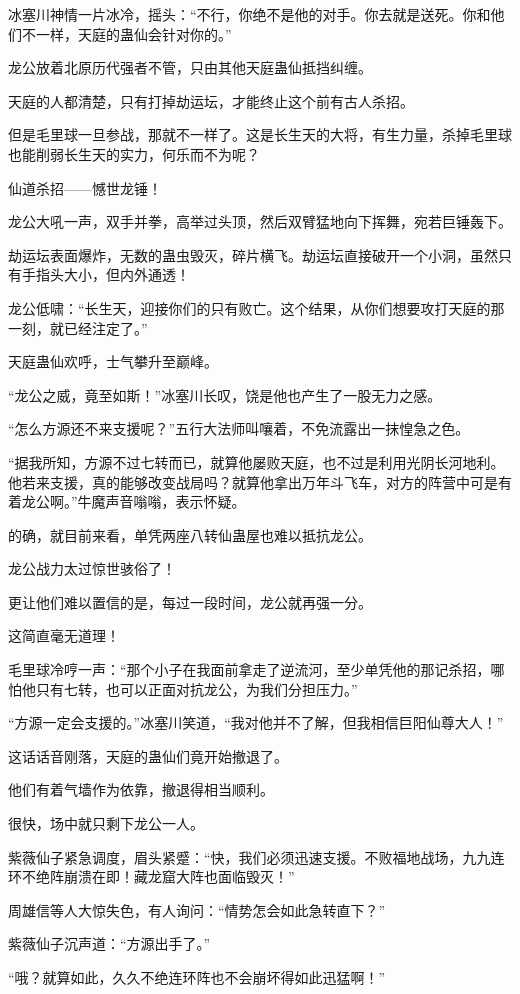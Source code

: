 \begin{this_body}
冰塞川神情一片冰冷，摇头：“不行，你绝不是他的对手。你去就是送死。你和他们不一样，天庭的蛊仙会针对你的。”

龙公放着北原历代强者不管，只由其他天庭蛊仙抵挡纠缠。

天庭的人都清楚，只有打掉劫运坛，才能终止这个前有古人杀招。

但是毛里球一旦参战，那就不一样了。这是长生天的大将，有生力量，杀掉毛里球也能削弱长生天的实力，何乐而不为呢？

仙道杀招——憾世龙锤！

龙公大吼一声，双手并拳，高举过头顶，然后双臂猛地向下挥舞，宛若巨锤轰下。

劫运坛表面爆炸，无数的蛊虫毁灭，碎片横飞。劫运坛直接破开一个小洞，虽然只有手指头大小，但内外通透！

龙公低啸：“长生天，迎接你们的只有败亡。这个结果，从你们想要攻打天庭的那一刻，就已经注定了。”

天庭蛊仙欢呼，士气攀升至巅峰。

“龙公之威，竟至如斯！”冰塞川长叹，饶是他也产生了一股无力之感。

“怎么方源还不来支援呢？”五行大法师叫嚷着，不免流露出一抹惶急之色。

“据我所知，方源不过七转而已，就算他屡败天庭，也不过是利用光阴长河地利。他若来支援，真的能够改变战局吗？就算他拿出万年斗飞车，对方的阵营中可是有着龙公啊。”牛魔声音嗡嗡，表示怀疑。

的确，就目前来看，单凭两座八转仙蛊屋也难以抵抗龙公。

龙公战力太过惊世骇俗了！

更让他们难以置信的是，每过一段时间，龙公就再强一分。

这简直毫无道理！

毛里球冷哼一声：“那个小子在我面前拿走了逆流河，至少单凭他的那记杀招，哪怕他只有七转，也可以正面对抗龙公，为我们分担压力。”

“方源一定会支援的。”冰塞川笑道，“我对他并不了解，但我相信巨阳仙尊大人！”

这话话音刚落，天庭的蛊仙们竟开始撤退了。

他们有着气墙作为依靠，撤退得相当顺利。

很快，场中就只剩下龙公一人。

紫薇仙子紧急调度，眉头紧蹙：“快，我们必须迅速支援。不败福地战场，九九连环不绝阵崩溃在即！藏龙窟大阵也面临毁灭！”

周雄信等人大惊失色，有人询问：“情势怎会如此急转直下？”

紫薇仙子沉声道：“方源出手了。”

“哦？就算如此，久久不绝连环阵也不会崩坏得如此迅猛啊！”


\end{this_body}
